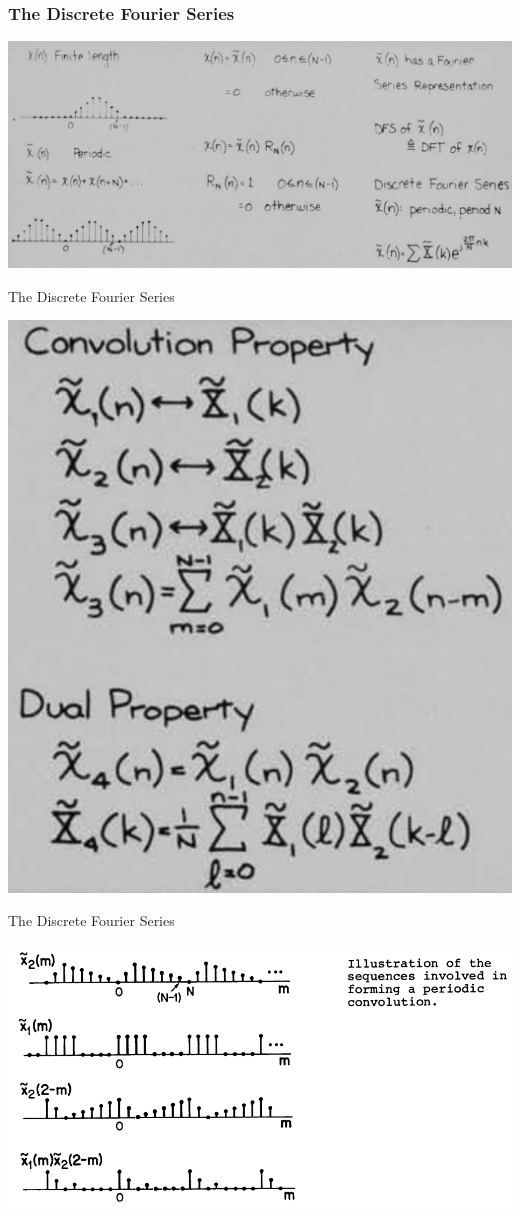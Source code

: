 \documentclass[pdflatex,compress,mathserif]{beamer}
\begin{document}
\begin{frame}
	\frametitle{The Discrete Fourier Series}
	\begin{center}
		\includegraphics[width=\linewidth]{img/img01}
	\end{center}
\end{frame}

\begin{frame}{The Discrete Fourier Series}
	\begin{center}
		\includegraphics[width=0.5\linewidth]{img/img03}
	\end{center}
\end{frame}

\begin{frame}{The Discrete Fourier Series}
	\begin{center}
		\includegraphics[width=\linewidth]{img/img04}
	\end{center}
\end{frame}
\end{document}
